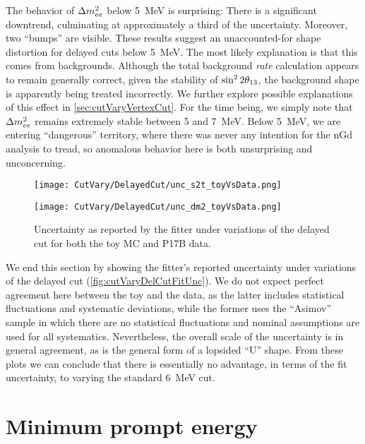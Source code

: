 \documentclass[../thesis.tex]{subfiles}
\begin{document}
The behavior of $\Delta m^2_{ee}$ below 5~MeV is surprising: There is a significant downtrend, culminating at approximately a third of the uncertainty. Moreover, two ``bumps'' are visible. These results suggest an unaccounted-for shape distortion for delayed cuts below 5~MeV. The most likely explanation is that this comes from backgrounds. Although the total background \emph{rate} calculation appears to remain generally correct, given the stability of $\sin^2 2\theta_{13}$, the background shape is apparently being treated incorrectly. We further explore possible explanations of this effect in \autoref{sec:cutVaryVertexCut}. For the time being, we simply note that $\Delta m^2_{ee}$ remains extremely stable between 5 and 7~MeV. Below 5~MeV, we are entering ``dangerous'' territory, where there was never any intention for the nGd analysis to tread, so anomalous behavior here is both unsurprising and unconcerning.

\begin{figure}[ht]
  \begin{minipage}{0.5\linewidth}%
    \texttt{[image: CutVary/DelayedCut/unc\_s2t\_toyVsData.png]}%
  \end{minipage}%
  \begin{minipage}{0.5\linewidth}%
    \texttt{[image: CutVary/DelayedCut/unc\_dm2\_toyVsData.png]}%
  \end{minipage}%
  \caption{Uncertainty as reported by the fitter under variations of the delayed cut for both the toy MC and P17B data.}
  \label{fig:cutVaryDelCutFitUnc}
\end{figure}

We end this section by showing the fitter's reported uncertainty under variations of the delayed cut (\autoref{fig:cutVaryDelCutFitUnc}). We do not expect perfect agreement here between the toy and the data, as the latter includes statistical fluctuations and systematic deviations, while the former uses the ``Asimov'' sample in which there are no statistical fluctuations and nominal assumptions are used for all systematics. Nevertheless, the overall scale of the uncertainty is in general agreement, as is the general form of a lopsided ``U'' shape. From these plots we can conclude that there is essentially no advantage, in terms of the fit uncertainty, to varying the standard 6~MeV cut.

\section{Minimum prompt energy}
\label{sec:cutVaryMinPrompt}
\end{document}
